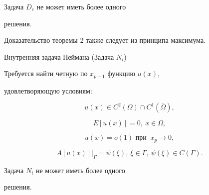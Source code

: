 \begin{theorem}[2]Задача $D_e $ не может иметь более одного


решения.


\end{theorem}


Доказательство теоремы 2 также следует из принципа максимума.





\begin{newthm}{Внутренняя задача Неймана (Задача $N_i $)}


Требуется найти четную по $x_{p - 1} $ функцию $u(x)$, 


удовлетворяющую условиям{\rm:}


\begin{equation}


\label{chebotareva:eq36} u(x) \in C^2\left( \Omega \right) \cap


C^1\left( {\overline \Omega } \right), 


\end{equation}


\begin{equation}


\label{chebotareva:eq37} E\left[ {u(x)} \right] = 0,  ~ x \in


\Omega , 


\end{equation}


\begin{equation}


\label{chebotareva:eq38} u(x) = o(1)\text{ при } ~ x_p \to 0,


\end{equation}


\begin{equation}


\label{chebotareva:eq39} A\left[ {u\left( x \right)} \right]\big|_\Gamma = \psi (\xi ),  ~ \xi \in \Gamma ,  ~ \psi (\xi )


\in C\left( \Gamma \right).


\end{equation}


\end{newthm}





\begin{theorem}[3]Задача $N_i$ не может иметь более одного


решения.


\end{theorem}


